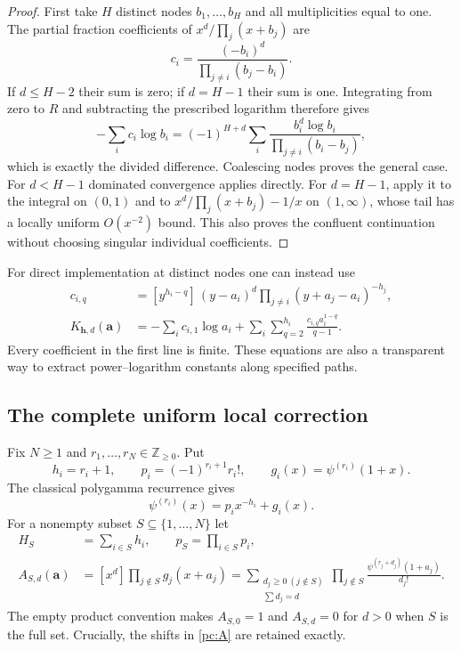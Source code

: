 \documentclass[11pt,a4paper]{article}
\theoremstyle{definition}
\theoremstyle{remark}
\numberwithin{equation}{section}
\begin{document}
\begin{proof}
First take $H$ distinct nodes $b_1,\ldots,b_H$ and all multiplicities
equal to one.  The partial fraction coefficients of
$x^d/\prod_j(x+b_j)$ are
\[
 c_i=\frac{(-b_i)^d}{\prod_{j\ne i}(b_j-b_i)}.
\]
If $d\le H-2$ their sum is zero; if $d=H-1$ their sum is one.
Integrating from zero to $R$ and subtracting the prescribed logarithm
therefore gives
\[
 -\sum_i c_i\log b_i
   =(-1)^{H+d}\sum_i
          \frac{b_i^d\log b_i}{\prod_{j\ne i}(b_i-b_j)},
\]
which is exactly the divided difference.  Coalescing nodes proves the
general case.  For $d<H-1$ dominated convergence applies directly.
For $d=H-1$, apply it to the integral on $(0,1)$ and to
$x^d/\prod_j(x+b_j)-1/x$ on $(1,\infty)$, whose tail has a
locally uniform $O(x^{-2})$ bound.  This also proves the confluent
continuation without choosing singular individual coefficients.
\end{proof}

For direct implementation at distinct nodes one can instead use
\begin{align}\label{pc:partial-fractions}
 c_{i,q}&=[y^{h_i-q}]\,(y-a_i)^d
                      \prod_{j\ne i}(y+a_j-a_i)^{-h_j},\\
 K_{\boldsymbol h,d}(\boldsymbol a)
   &=-\sum_i c_{i,1}\log a_i
       +\sum_i\sum_{q=2}^{h_i}
                    \frac{c_{i,q}a_i^{1-q}}{q-1}.
                    \label{pc:kernel-rational}
\end{align}
Every coefficient in the first line is finite.  These equations are
also a transparent way to extract power--logarithm constants along
specified paths.

\subsection{The complete uniform local correction}

Fix $N\ge1$ and $r_1,\ldots,r_N\in\mathbb Z_{\ge0}$.  Put
\[
 h_i=r_i+1,\qquad p_i=(-1)^{r_i+1}r_i!,\qquad
 g_i(x)=\psi^{(r_i)}(1+x).
\]
The classical polygamma recurrence \cite[Eq.~5.15.5]{DLMF} gives
\begin{equation}\label{pc:split}
 \psi^{(r_i)}(x)=p_i x^{-h_i}+g_i(x).
\end{equation}
For a nonempty subset $S\subseteq\{1,\ldots,N\}$ let
\begin{align}
 H_S&=\sum_{i\in S}h_i,\qquad p_S=\prod_{i\in S}p_i,\\
 A_{S,d}(\boldsymbol a)
   &=[x^d]\prod_{j\notin S}g_j(x+a_j)
     =\sum_{\substack{d_j\ge0\ (j\notin S)\\\sum d_j=d}}
          \prod_{j\notin S}
              \frac{\psi^{(r_j+d_j)}(1+a_j)}{d_j!}.
              \label{pc:A}
\end{align}
The empty product convention makes $A_{S,0}=1$ and $A_{S,d}=0$
for $d>0$ when $S$ is the full set.  Crucially, the shifts in
\eqref{pc:A} are retained exactly.
\end{document}
